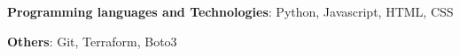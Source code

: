 \begin{cvempty} %
    \begin{cvitems} %
        \item{\textbf{Programming languages and Technologies}: Python, Javascript, HTML, CSS}
        \item{\textbf{Others}: Git, Terraform, Boto3}
    \end{cvitems}
\end{cvempty}
